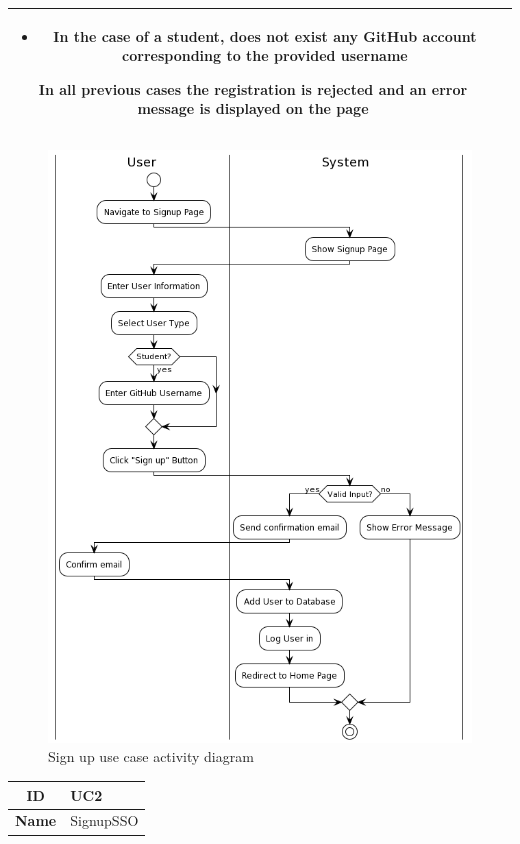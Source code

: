 \begin{center}
\begin{tabular}{ |c|m{10cm}| }
\begin{itemize}
            \item In the case of a student, does not exist any GitHub account corresponding to the provided username
        \end{itemize} 
        In all previous cases the registration is rejected and an error message is displayed on the page \\
        \hline
    \end{tabular}
    \begin{figure}[H]
        \hspace{52px}
        \includegraphics[scale=0.5]{Diagrams/activity_signup.png}
        \caption{Sign up use case activity diagram}
    \end{figure}
    \begin{tabular}{ |c|m{10cm}| }
        \hline
        \textbf{ID} & UC2 \\
        \hline
        \textbf{Name} & SignupSSO \\

\end{tabular}
\end{center}
